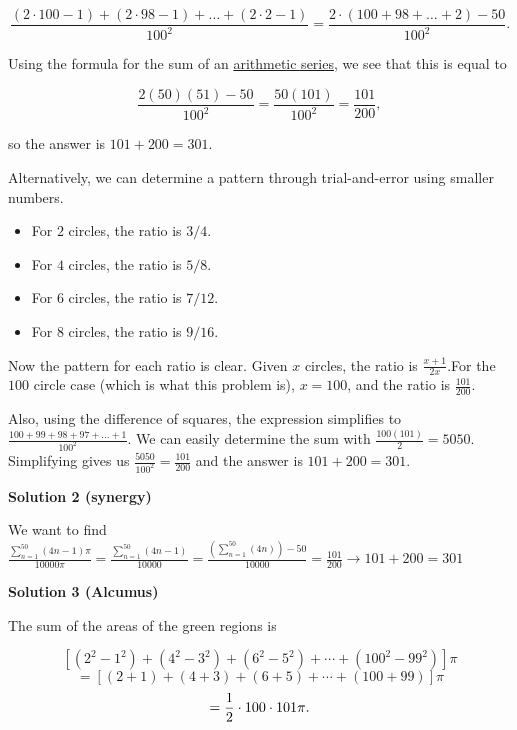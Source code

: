 \begin{enumerate}
 
 \[\frac{(2\cdot100 - 1)+(2\cdot98 - 1) + \ldots + (2\cdot 2 - 1)}{100^{2}} = \frac{2\cdot(100 + 98 + \ldots + 2) - 50}{100^2}.\] 

 Using the formula for the sum of an \href{https://artofproblemsolving.com/wiki/index.php?title=Arithmetic\_series}{arithmetic series}, we see that this is equal to 

 
 \[\frac{2(50)(51)-50}{100^{2}}=\frac{50(101)}{100^{2}}=\frac{101}{200},\]

 so the answer is $101 + 200 =\boxed{301}$.

 Alternatively, we can determine a pattern through trial-and-error using smaller numbers. 

 
            \begin{itemize}
        \item For $2$ circles, the ratio is $3/4$.
        \item For $4$ circles, the ratio is $5/8$.
        \item For $6$ circles, the ratio is $7/12$.
        \item For $8$ circles, the ratio is $9/16$.
            \end{itemize}
            Now the pattern for each ratio is clear.  Given $x$ circles, the ratio is $\frac{x+1}{2x}$.For the $100$ circle case (which is what this problem is), $x=100$, and the ratio is $\frac{101}{200}$.

 


 Also, using the difference of squares, the expression simplifies to $\frac{100 + 99 + 98 + 97 + ... + 1}{100^2}$. We can easily determine the sum with $\frac{100(101)}{2} = 5050$. Simplifying gives us $\frac{5050}{100^2} = \frac{101}{200}$ and the answer is $101 + 200 =\boxed{301}$.

 



\textbf{Solution 2 (synergy)}

We want to find $\frac{\sum\limits_{n=1}^{50} (4n-1)\pi}{10000\pi}=\frac{\sum\limits_{n=1}^{50} (4n-1)}{10000}=\frac{(\sum\limits_{n=1}^{50} (4n) )-50}{10000}=\frac{101}{200} \rightarrow 101+200=\boxed{301}$




\textbf{Solution 3 (Alcumus)}

The sum of the areas of the green regions is

 
 \[\left[(2^2-1^2)+(4^2-3^2)+(6^2-5^2)+\cdots+(100^2-99^2)\right]\pi\]
 \[=\left[(2+1)+(4+3)+(6+5)+\cdots+(100+99)\right]\pi\]
 \[={1\over2}\cdot100\cdot101\pi.\]


\end{enumerate}
